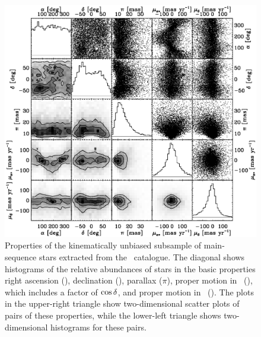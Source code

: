 \clearpage
\begin{figure}
\includegraphics[width=\textwidth]{figs_veldist/hipparcos2_properties.ps}
\caption[Properties of the kinematically unbiased subsample of main-sequence stars extracted from the \Hipparcos\ catalogue]{Properties of the kinematically unbiased subsample of main-sequence stars extracted from the \Hipparcos\ catalogue. The diagonal shows histograms of the relative abundances of stars in the basic properties right ascension (\ra), declination (\dec), parallax ($\pi$), proper motion in \ra\ (\pmrastar), which includes a factor of $\cos \delta$, and proper motion in \dec\ (\pmdec). The plots in the upper-right triangle show two-dimensional scatter plots of pairs of these properties, while the lower-left triangle shows two-dimensional histograms for these pairs.}%
\label{fig:hip2prop}%
\end{figure}

